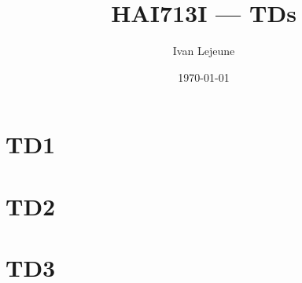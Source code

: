 \documentclass[french,a4paper,10pt]{article}
\title{\color{astral} \sffamily \bfseries HAI713I --- TDs}
\author{Ivan Lejeune}
\date{\today}
\begin{document}
    \maketitle
    \tableofcontents

    \newpage
    \section{TD1}\label{sec:TD1}
    \setcounter{tdcounter}{0}
    

    \newpage
    \section{TD2}\label{sec:TD2}
    \setcounter{tdcounter}{0}
    

    \newpage
    \section{TD3}\label{sec:TD3}
    \setcounter{tdcounter}{0}
    
\end{document}
